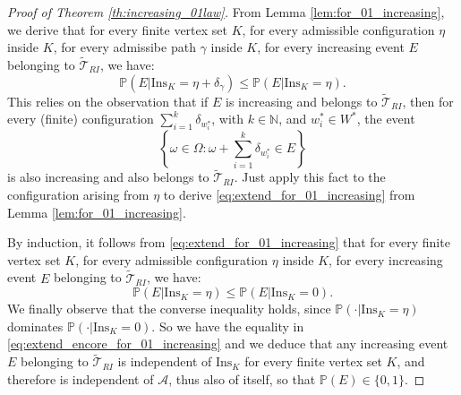 \documentclass[12pt,a4paper]{article}
\newcommand{\1}[1]{{\mathbf 1}{\{#1\}}}
\newcommand{\N}{{\mathbb N}}
\newcommand{\8}{{\infty}}
\newcommand{\p}{\mathbb{P}}
\newcommand{\In}{\mathrm{Ins}}
\begin{document}
\begin{proof}[Proof of Theorem \ref{th:increasing_01law}]
  From Lemma \ref{lem:for_01_increasing}, we derive that for every finite vertex set $K$, for every admissible configuration $\eta$ inside $K$, for every admissibe path $\gamma$ inside $K$, for every increasing event $E$ belonging to $\widetilde{\mathcal{T}}_{RI}$, we have:
  \begin{equation}\label{eq:extend_for_01_increasing}
    \p(E | \In_K=\eta + \delta_\gamma) \le \p(E| \In_K=\eta).
  \end{equation}
  This relies on the observation that if $E$ is increasing and belongs to  $\widetilde{\mathcal{T}}_{RI}$, then for every (finite) configuration $\sum_{i=1}^k \delta_{w_i^*}$, with $k\in \N$, and $w_i^*\in W^*$, the event
  \begin{equation}
    \left\{ \omega \in \Omega : \omega + \sum_{i=1}^k \delta_{w_i^*} \in E \right\}
  \end{equation} 
  is also increasing and also belongs to $\widetilde{\mathcal{T}}_{RI}$. Just apply this fact to the configuration arising from $\eta$ to derive \eqref{eq:extend_for_01_increasing} from Lemma \ref{lem:for_01_increasing}.

  By induction, it follows from \eqref{eq:extend_for_01_increasing} that for every finite vertex set $K$, for every admissible configuration $\eta$ inside $K$, for every increasing event $E$ belonging to $\widetilde{\mathcal{T}}_{RI}$, we have:
  \begin{equation}\label{eq:extend_encore_for_01_increasing}
    \p(E | \In_K=\eta ) \le \p(E| \In_K= 0 ).
  \end{equation}
  We finally observe that the converse inequality holds, since $\p( \cdot | \In_K=\eta ) $ dominates $\p(\cdot | \In_K= 0 )$. So we have the equality in \eqref{eq:extend_encore_for_01_increasing} and we deduce that any increasing event $E$ belonging to $\widetilde{\mathcal{T}}_{RI}$ is independent of $\In_K$ for every finite vertex set $K$, and therefore is independent of $\mathcal{A}$, thus also of itself, so that $\p(E)\in \{0, 1\}$. 
\end{proof}








\end{document}
